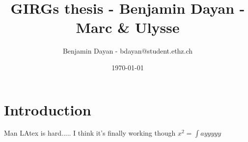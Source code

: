 \documentclass[a4paper]{article}
\title{GIRGs thesis - Benjamin Dayan - Marc \& Ulysse }
\author{Benjamin Dayan - bdayan@student.ethz.ch}
\date{\today}
\begin{document}
{\let\clearpage\relax \maketitle}
{\let\clearpage\relax \tableofcontents} 

\section{Introduction}
Man LAtex is hard.....
I think it's finally working though $x^2 = \int ayyyyy$
\end{document}
